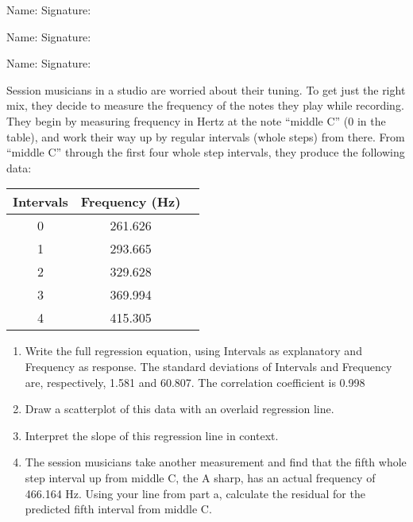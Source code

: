 \documentclass[11pt]{book}\usepackage[]{graphicx}\usepackage[]{color}
\begin{document}
\begin{exercises}
\begin{exercise}
\begin{center}
{{\vspace{4mm}
Name: \underline{\phantom{xxxxxxxxxxxxxxxxxxxxxxxx}} Signature: \underline{\phantom{xxxxxxxxxxxxxxxxxxxxxxxx}}

\vspace{4mm}
Name: \underline{\phantom{xxxxxxxxxxxxxxxxxxxxxxxx}} Signature: \underline{\phantom{xxxxxxxxxxxxxxxxxxxxxxxx}}

\vspace{4mm}
Name: \underline{\phantom{xxxxxxxxxxxxxxxxxxxxxxxx}} Signature: \underline{\phantom{xxxxxxxxxxxxxxxxxxxxxxxx}}
 }}
\end{center}

Session musicians in a studio are worried about their tuning. To get just the right mix, they decide to measure the frequency of the notes they play while recording. They begin by measuring frequency in Hertz at the note ``middle C'' (0 in the table), and work their way up by regular intervals (whole steps) from there. From ``middle C'' through the first four whole step intervals, they produce the following data:

\begin{center}
\begin{tabular}{@{} ccc @{}} \hline
Intervals &	Frequency (Hz) \\ \hline
0&	261.626 \\
1&	293.665 \\
2&	329.628 \\
3&	369.994 \\
4&	415.305 \\ \hline
\end{tabular}
\end{center}

\begin{enumerate}
  \item Write the full regression equation, using Intervals as explanatory and Frequency as response. The standard deviations of Intervals and Frequency are, respectively, 1.581 and 60.807. The correlation coefficient is 0.998
  \item Draw a scatterplot of this data with an overlaid regression line.
  \item	Interpret the slope of this regression line in context.
  \item	The session musicians take another measurement and find that the fifth whole step interval up from middle C, the A sharp, has an actual frequency of 466.164 Hz. Using your line from part a, calculate the residual for the predicted fifth interval from middle C.
\end{enumerate}


\end{exercise}
\end{exercises}
\end{document}
